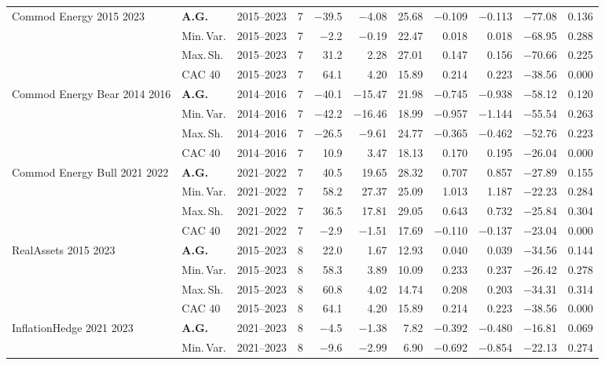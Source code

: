\begin{longtable}{p{2.6cm} l c c r r r r r r r}
\midrule
Commod Energy 2015 2023 & \textbf{A.G.} & 2015--2023 & 7 & $-$39.5 & $-$4.08 & 25.68 & $-$0.109 & $-$0.113 & $-$77.08 & 0.136 \\
 & Min.\,Var. & 2015--2023 & 7 & $-$2.2 & $-$0.19 & 22.47 & 0.018 & 0.018 & $-$68.95 & 0.288 \\
 & Max.\,Sh. & 2015--2023 & 7 & 31.2 & 2.28 & 27.01 & 0.147 & 0.156 & $-$70.66 & 0.225 \\
 & CAC 40 & 2015--2023 & 7 & 64.1 & 4.20 & 15.89 & 0.214 & 0.223 & $-$38.56 & 0.000 \\
\midrule
Commod Energy Bear 2014 2016 & \textbf{A.G.} & 2014--2016 & 7 & $-$40.1 & $-$15.47 & 21.98 & $-$0.745 & $-$0.938 & $-$58.12 & 0.120 \\
 & Min.\,Var. & 2014--2016 & 7 & $-$42.2 & $-$16.46 & 18.99 & $-$0.957 & $-$1.144 & $-$55.54 & 0.263 \\
 & Max.\,Sh. & 2014--2016 & 7 & $-$26.5 & $-$9.61 & 24.77 & $-$0.365 & $-$0.462 & $-$52.76 & 0.223 \\
 & CAC 40 & 2014--2016 & 7 & 10.9 & 3.47 & 18.13 & 0.170 & 0.195 & $-$26.04 & 0.000 \\
\midrule
Commod Energy Bull 2021 2022 & \textbf{A.G.} & 2021--2022 & 7 & 40.5 & 19.65 & 28.32 & 0.707 & 0.857 & $-$27.89 & 0.155 \\
 & Min.\,Var. & 2021--2022 & 7 & 58.2 & 27.37 & 25.09 & 1.013 & 1.187 & $-$22.23 & 0.284 \\
 & Max.\,Sh. & 2021--2022 & 7 & 36.5 & 17.81 & 29.05 & 0.643 & 0.732 & $-$25.84 & 0.304 \\
 & CAC 40 & 2021--2022 & 7 & $-$2.9 & $-$1.51 & 17.69 & $-$0.110 & $-$0.137 & $-$23.04 & 0.000 \\
\midrule
RealAssets 2015 2023 & \textbf{A.G.} & 2015--2023 & 8 & 22.0 & 1.67 & 12.93 & 0.040 & 0.039 & $-$34.56 & 0.144 \\
 & Min.\,Var. & 2015--2023 & 8 & 58.3 & 3.89 & 10.09 & 0.233 & 0.237 & $-$26.42 & 0.278 \\
 & Max.\,Sh. & 2015--2023 & 8 & 60.8 & 4.02 & 14.74 & 0.208 & 0.203 & $-$34.31 & 0.314 \\
 & CAC 40 & 2015--2023 & 8 & 64.1 & 4.20 & 15.89 & 0.214 & 0.223 & $-$38.56 & 0.000 \\
\midrule
InflationHedge 2021 2023 & \textbf{A.G.} & 2021--2023 & 8 & $-$4.5 & $-$1.38 & 7.82 & $-$0.392 & $-$0.480 & $-$16.81 & 0.069 \\
 & Min.\,Var. & 2021--2023 & 8 & $-$9.6 & $-$2.99 & 6.90 & $-$0.692 & $-$0.854 & $-$22.13 & 0.274 \\

\end{longtable}

